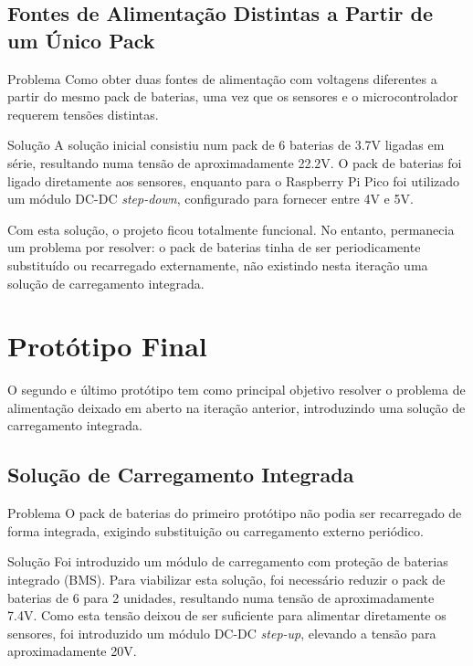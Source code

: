 \documentclass[11pt,a4paper]{article}
\begin{document}
\subsection{Fontes de Alimentação Distintas a Partir de um Único Pack}

\begin{probsol}{Problema}
Como obter duas fontes de alimentação com voltagens diferentes a partir do mesmo pack de baterias, uma vez que os sensores e o microcontrolador requerem tensões distintas.
\end{probsol}

\begin{probsol}{Solução}
A solução inicial consistiu num pack de 6 baterias de 3.7V ligadas em série, resultando numa tensão de aproximadamente 22.2V. O pack de baterias foi ligado diretamente aos sensores, enquanto para o Raspberry Pi Pico foi utilizado um módulo DC-DC \textit{step-down}, configurado para fornecer entre 4V e 5V.
\end{probsol}

Com esta solução, o projeto ficou totalmente funcional. No entanto, permanecia um problema por resolver: o pack de baterias tinha de ser periodicamente substituído ou recarregado externamente, não existindo nesta iteração uma solução de carregamento integrada.

\section{Protótipo Final}

O segundo e último protótipo tem como principal objetivo resolver o problema de alimentação deixado em aberto na iteração anterior, introduzindo uma solução de carregamento integrada.

\subsection{Solução de Carregamento Integrada}

\begin{probsol}{Problema}
O pack de baterias do primeiro protótipo não podia ser recarregado de forma integrada, exigindo substituição ou carregamento externo periódico.
\end{probsol}

\begin{probsol}{Solução}
Foi introduzido um módulo de carregamento com proteção de baterias integrado (BMS). Para viabilizar esta solução, foi necessário reduzir o pack de baterias de 6 para 2 unidades, resultando numa tensão de aproximadamente 7.4V. Como esta tensão deixou de ser suficiente para alimentar diretamente os sensores, foi introduzido um módulo DC-DC \textit{step-up}, elevando a tensão para aproximadamente 20V.
\end{probsol}
\end{document}

